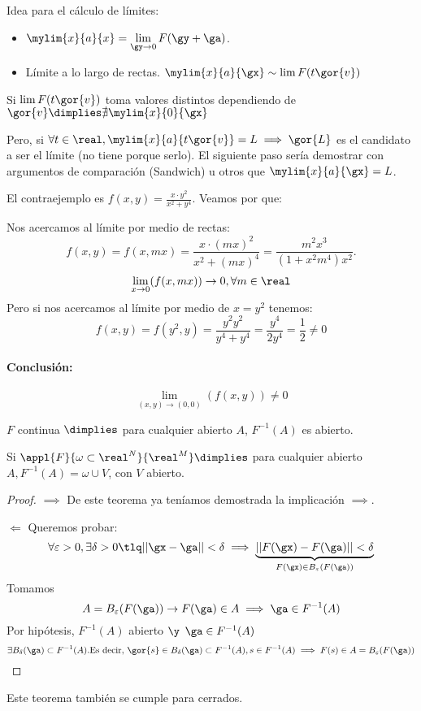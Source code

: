 \documentclass[a4paper,10pt]{apuntes}
\begin{document}
 Idea para el cálculo de límites: 
 \begin{itemize}
  \item $\displaystyle\mylim{x}{a}{x} = \lim_{\gy\rightarrow 0} F(\gy+\ga)$.
  \item Límite a lo largo de rectas. $\displaystyle\mylim{x}{a}{\gx} \sim \lim F({t\gor{v}})$
 
 \end{itemize}
 
 Si $\displaystyle\lim F({t\gor{v}})$ toma valores distintos dependiendo de $\gor{v} \dimplies \nexists \displaystyle\mylim{x}{0}{\gx}$
 
 Pero, si $\forall t \in \real, \mylim{x}{a}{t\gor{v}} = L \implies \gor{L}$ es el candidato a ser el límite (no tiene porque serlo). El siguiente paso sería demostrar con argumentos de comparación (Sandwich) u otros que $\mylim{x}{a}{\gx} = L$.
 
 El contraejemplo es $f(x,y) = \frac{x\cdot y^2}{x^2 + y^4}$. Veamos por que:
 
 Nos acercamos al límite por medio de rectas:
 $$f(x,y) = f(x,mx) = \frac{x\cdot(mx)^2}{x^2 + (mx)^4} = \frac{m^2x^3}{(1 + x^2m^4)x^2}.$$
 $$\displaystyle\lim_{x\rightarrow 0} (f(x,mx)) \rightarrow 0, \forall m \in \real$$
 Pero si nos acercamos al límite por medio de $x = y^2$ tenemos:
 $$f(x,y) = f(y^2,y) = \frac{y^2y^2}{y^4+y^4} = \frac{y^4}{2y^4} = \frac{1}{2}\neq 0$$
 \paragraph{Conclusión:}
 
 $$\lim_{(x,y) \rightarrow (0,0)} (f(x,y)) \neq 0$$
 
 
\begin{theorem}
 $F$ continua $\dimplies$ para cualquier abierto $A$, $F^{-1}(A)$ es abierto.
\end{theorem}
\obs
Si $\appl{F}{\omega\subset\real^N}{\real^M} \dimplies$ para cualquier abierto $A, F^{-1}(A) = \omega \cup V$, con $V$ abierto.

\begin{proof}
$\implies$ De este teorema ya teníamos demostrada la implicación $\implies$.

$\Leftarrow$ Queremos probar: $$\forall \varepsilon > 0, \exists \delta>0 \tlq ||\gx-\ga||<\delta \implies \underbrace{||F(\gx)-F(\ga)||<\delta}_{F(\gx)\in B_{\varepsilon}(F(\ga))}$$
Tomamos  $$A = B_{\varepsilon}(F(\ga)) \rightarrow F(\ga) \in A \implies \ga \in F^{-1}(A)$$
Por hipótesis, $F^{-1}(A)$ abierto $\y$ $\ga \in F^{-1}(A)$
$$\exists B_{\delta}(\ga) \subset F^{-1}(A) \text{.Es decir, } \gor{s}\in B_{\delta}(\ga) \subset F^{-1}(A), s\in F^{-1}(A) \implies F(s) \in A = B_{\varepsilon}(F(\ga))$$

\end{proof}
\begin{remark}
Este teorema también se cumple para cerrados.
\end{remark}
\end{document}
